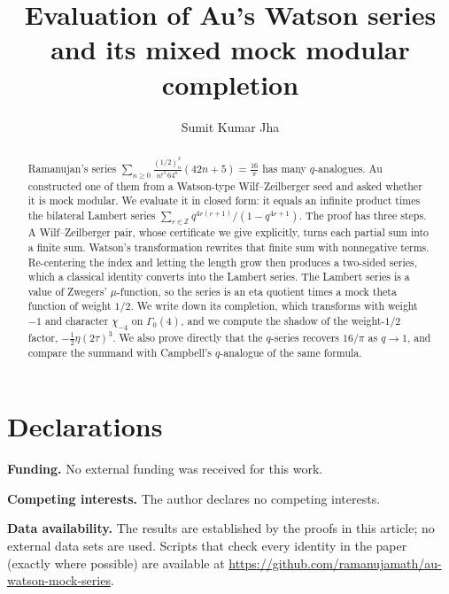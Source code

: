 \documentclass[11pt]{amsart}
\numberwithin{equation}{section}
\theoremstyle{plain}
\theoremstyle{definition}
\newcommand{\Z}{\mathbb{Z}}
\begin{document}
\title{Evaluation of Au's Watson series and its mixed mock modular completion}
\author{Sumit Kumar Jha}
\address{Greater Noida, India}

\begin{abstract}
Ramanujan's series $\sum_{n\ge0}\frac{(1/2)_n^3}{n!^3\,64^n}(42n+5)=\frac{16}{\pi}$
has many $q$-analogues. Au constructed one of them from a Watson-type
Wilf--Zeilberger seed and asked whether it is mock modular. We evaluate it in
closed form: it equals an infinite product times the bilateral Lambert series
$\sum_{r\in\Z}q^{4r(r+1)}/(1-q^{4r+1})$. The proof has three steps. A
Wilf--Zeilberger pair, whose certificate we give explicitly, turns each partial
sum into a finite sum. Watson's transformation rewrites that finite sum with
nonnegative terms. Re-centering the index and letting the length grow then
produces a two-sided series, which a classical identity converts into the
Lambert series. The Lambert series is a value of Zwegers' $\mu$-function, so
the series is an eta quotient times a mock theta function of weight $1/2$. We
write down its completion, which transforms with weight $-1$ and character
$\chi_{-4}$ on $\Gamma_0(4)$, and we compute the shadow of the weight-$1/2$
factor, $-\frac12\eta(2\tau)^3$. We also prove directly that the $q$-series
recovers $16/\pi$ as $q\to1$, and compare the summand with Campbell's
$q$-analogue of the same formula.
\end{abstract}

\maketitle








\appendix


\section*{Declarations}
\noindent\textbf{Funding.} No external funding was received for this work.

\noindent\textbf{Competing interests.} The author declares no competing interests.

\noindent\textbf{Data availability.} The results are established by the proofs
in this article; no external data sets are used. Scripts that check every
identity in the paper (exactly where possible) are available at
\url{https://github.com/ramanujamath/au-watson-mock-series}.


\end{document}
